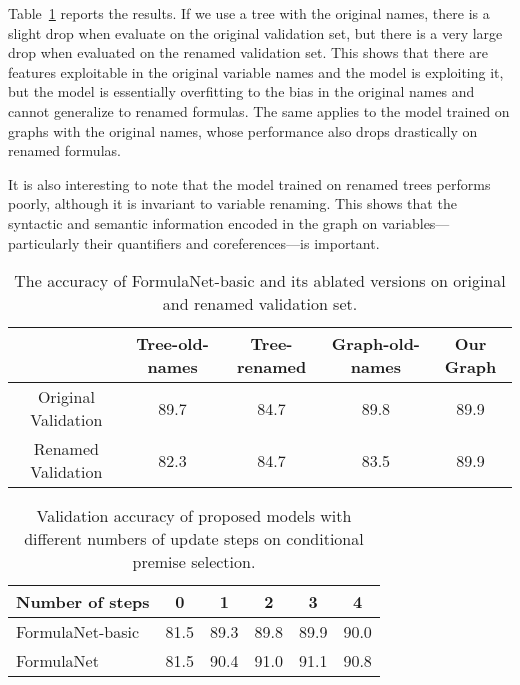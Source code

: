 \documentclass{article}
\begin{document}
Table~\ref{tab:rename} reports the results. If we use a tree
with the original names, there is a slight drop when evaluate on the original validation
set, but there is a very large drop when evaluated on the renamed validation set. This
shows that there are features exploitable in the original variable names and the
model is exploiting it, but the model is essentially overfitting to the bias in the
original names and cannot generalize to renamed formulas. The same applies to the model trained on graphs with the
original names, whose performance also drops drastically on renamed formulas. 

It is also interesting to note that the model trained on renamed trees performs poorly,
although it is invariant to variable renaming. This shows that the syntactic and semantic
information encoded in the graph on variables---particularly their quantifiers and
coreferences---is important.  

\begin{table}[t]
\caption{The accuracy of FormulaNet-basic and its ablated versions on original and renamed validation set. }
	\centering
	\vspace{-1mm}
	\begin{tabular}{c c c c c }\hline
	 & Tree-old-names & Tree-renamed & Graph-old-names & Our Graph \\ \hline
	Original Validation & 89.7 & 84.7 & 89.8 & 89.9\\ 
	Renamed Validation & 82.3 & 84.7 & 83.5 & 89.9\\ \hline
	\end{tabular}
	\label{tab:rename}
\end{table} 

\begin{table}[t]
	\caption{Validation accuracy of proposed models with different numbers of update steps on conditional premise selection.}
	\centering
	\vspace{-2mm}
	\begin{tabular}{l c c c c c }
	\hline
	Number of steps & 0 & 1 & 2 & 3 & 4 \\ \hline
	FormulaNet-basic  & 81.5 & 89.3 & 89.8 & 89.9 & 90.0 \\ 
	FormulaNet & 81.5 & 90.4 & 91.0 & 91.1 & 90.8 \\
	\hline
	\end{tabular}
	\label{tab:multisteps}
	\vspace{-4mm}
\end{table}
\end{document}
